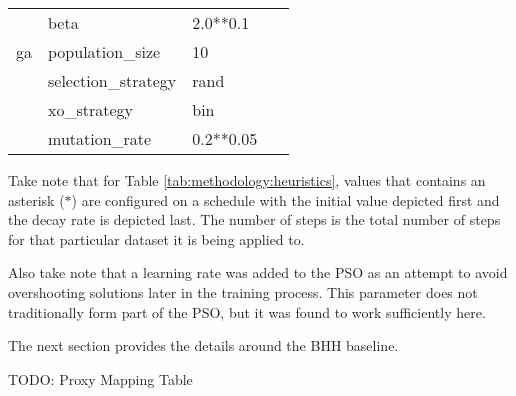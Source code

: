 \begin{table}[htbp]
{\begin{tabular}{llll}
                                     & beta                      & 2.0**0.1       &                            \\
                  ga                 & population\_size          & 10             & ~\cite{ref:lambora:2019}   \\
                                     & selection\_strategy       & rand           &                            \\
                                     & xo\_strategy              & bin            &                            \\
                                     & mutation\_rate            & 0.2**0.05      &                            \\
            \end{tabular}%
      }
\end{table}%

Take note that for Table \ref{tab:methodology:heuristics}, values that contains an asterisk ($*$) are configured on a schedule with the initial value depicted first and the decay rate is depicted last. The number of steps is the total number of steps for that particular dataset it is being applied to.

Also take note that a learning rate was added to the \ac{PSO} as an attempt to avoid overshooting solutions later in the training process. This parameter does not traditionally form part of the \ac{PSO}, but it was found to work sufficiently here.

The next section provides the details around the \ac{BHH} baseline.



















TODO: Proxy Mapping Table



























